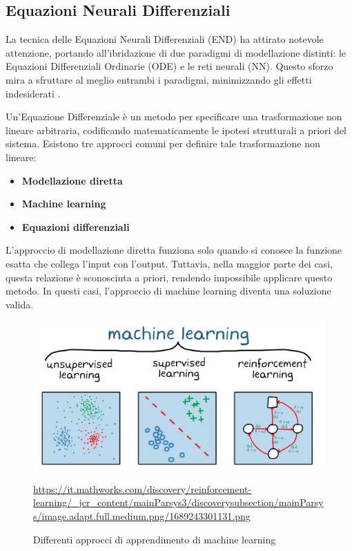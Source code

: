 \subsection{Equazioni Neurali Differenziali}

La tecnica delle Equazioni Neurali Differenziali 
(END) ha attirato notevole attenzione, portando all'ibridazione di due 
paradigmi di modellazione distinti: le Equazioni Differenziali Ordinarie 
(ODE) e le reti neurali (NN). Questo sforzo mira a sfruttare al meglio 
entrambi i paradigmi, minimizzando gli effetti indesiderati \cite{NEURIPS2018_69386f6b} \cite{Kim_2021}.

Un'Equazione Differenziale è un metodo per specificare una trasformazione 
non lineare arbitraria, codificando matematicamente le ipotesi strutturali 
a priori del sistema. Esistono tre approcci comuni per definire tale 
trasformazione non lineare:

\begin{itemize}
    \item \textbf{Modellazione diretta}
    \item \textbf{Machine learning}
    \item \textbf{Equazioni differenziali}
\end{itemize}

L'approccio di modellazione diretta funziona solo quando si conosce 
la funzione esatta che collega l'input con l'output. Tuttavia, nella 
maggior parte dei casi, questa relazione è sconosciuta a priori, 
rendendo impossibile applicare questo metodo. In questi casi, l'approccio 
di machine learning diventa una soluzione valida.

\begin{figure}[H]
    \begin{center}
        \includegraphics[width=\textwidth]{img/1689243301131.png}
        \caption{Differenti approcci di apprendimento di machine learning}
        \url{https://it.mathworks.com/discovery/reinforcement-learning/_jcr_content/mainParsys3/discoverysubsection/mainParsys/image.adapt.full.medium.png/1689243301131.png}
        \label{fig:ML_example}
    \end{center}
\end{figure}

